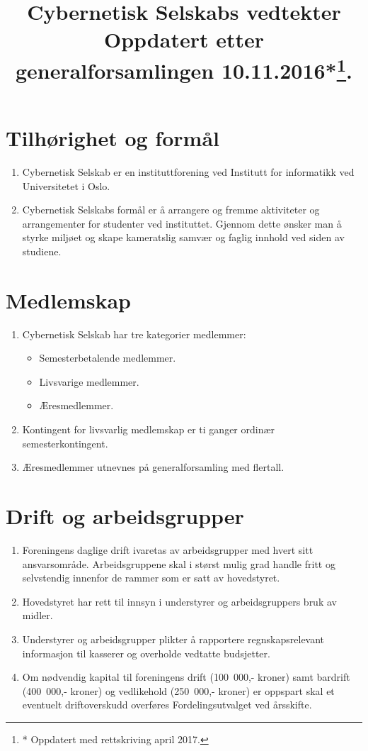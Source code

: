 \documentclass[8pt,norsk,a4paper]{article}
\title{\textbf{Cybernetisk Selskabs vedtekter} \\
	{\large Oppdatert etter generalforsamlingen 10.11.2016*\thanks{* Oppdatert med rettskriving april 2017.}.}}
\date{}
\author{}
\begin{document}
\maketitle{}

\section{Tilhørighet og formål}
\begin{enumerate}
	\item{Cybernetisk Selskab er en instituttforening ved Institutt for informatikk ved Universitetet i Oslo.}
	\item{Cybernetisk Selskabs formål er å arrangere og fremme aktiviteter og arrangementer for studenter ved instituttet. Gjennom dette ønsker man å styrke miljøet og skape kameratslig samvær og faglig innhold ved siden av studiene.}
\end{enumerate}

\section{Medlemskap}\label{sec:medlemskap}
\begin{enumerate}
	\item{Cybernetisk Selskab har tre kategorier medlemmer:}
	\begin{itemize}
		\item{Semesterbetalende medlemmer.}
		\item{Livsvarige medlemmer.}
		\item{Æresmedlemmer.}
	\end{itemize}
	\item{Kontingent for livsvarlig medlemskap er ti ganger ordinær semesterkontingent.}
	\item{Æresmedlemmer utnevnes på generalforsamling med  flertall.}
\end{enumerate}

\section{Drift og arbeidsgrupper}
\begin{enumerate}
	\item{Foreningens daglige drift ivaretas av arbeidsgrupper med hvert sitt ansvarsområde. Arbeidsgruppene skal i størst mulig grad handle fritt og selvstendig innenfor de rammer som er satt av hovedstyret.}
	\item{Hovedstyret har rett til innsyn i understyrer og arbeidsgruppers bruk av midler.}
	\item{Understyrer og arbeidsgrupper plikter å rapportere regnskapsrelevant informasjon til kasserer og overholde vedtatte budsjetter.}
	\item{Om nødvendig kapital til foreningens drift (100~000,- kroner) samt bardrift (400~000,- kroner) og vedlikehold (250~000,- kroner) er oppspart skal et eventuelt driftoverskudd overføres Fordelingsutvalget ved årsskifte.}
\end{enumerate}
\end{document}
